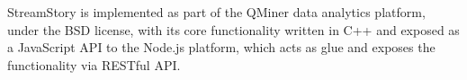 StreamStory is implemented as part of the QMiner \cite{qminer} data analytics platform,
under the BSD license, with its core functionality written in C++ and exposed as a 
JavaScript API to the Node.js platform, which acts as glue and exposes the functionality
via RESTful API.